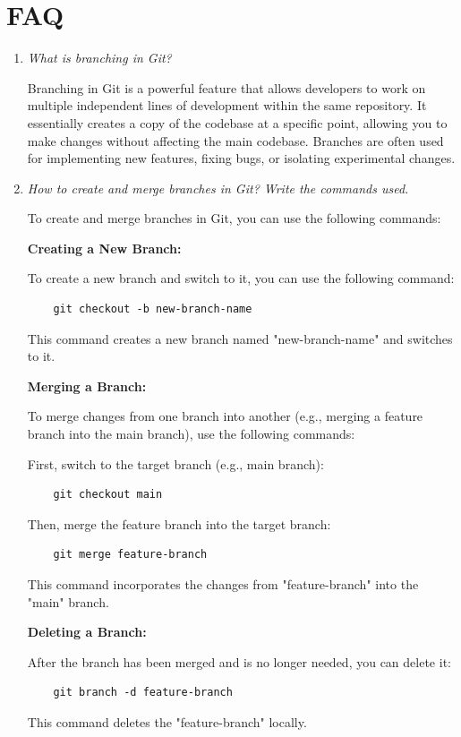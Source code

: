 \documentclass[11pt]{article}
\begin{document}
\section{FAQ}
\begin{enumerate}
    \item \textit{What is branching in Git?}

    Branching in Git is a powerful feature that allows developers to work on multiple independent lines of development within the same repository. It essentially creates a copy of the codebase at a specific point, allowing you to make changes without affecting the main codebase. Branches are often used for implementing new features, fixing bugs, or isolating experimental changes.

    \item \textit{How to create and merge branches in Git? Write the commands used.}

    To create and merge branches in Git, you can use the following commands:

    \textbf{Creating a New Branch:}
    
    To create a new branch and switch to it, you can use the following command:
    
    \begin{verbatim}
    git checkout -b new-branch-name
    \end{verbatim}

    This command creates a new branch named "new-branch-name" and switches to it.

    \textbf{Merging a Branch:}
    
    To merge changes from one branch into another (e.g., merging a feature branch into the main branch), use the following commands:

    First, switch to the target branch (e.g., main branch):

    \begin{verbatim}
    git checkout main
    \end{verbatim}

    Then, merge the feature branch into the target branch:

    \begin{verbatim}
    git merge feature-branch
    \end{verbatim}

    This command incorporates the changes from "feature-branch" into the "main" branch.

    \textbf{Deleting a Branch:}
    
    After the branch has been merged and is no longer needed, you can delete it:

    \begin{verbatim}
    git branch -d feature-branch
    \end{verbatim}

    This command deletes the "feature-branch" locally.

\end{enumerate}
\end{document}
